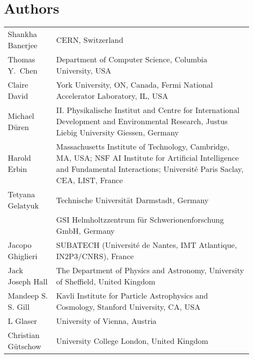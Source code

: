 \documentclass[../SustainableHEP.tex]{subfiles}
\begin{document}
\newpage


\section*{Authors}
{}
\renewcommand{\arraystretch}{1.5}
\noindent\begin{longtable*}{@{}m{0.3\textwidth} p{0.7\textwidth}}
Shankha Banerjee & CERN, Switzerland\\ %

Thomas Y.\ Chen & Department of Computer Science, Columbia University, USA\\

Claire David & York University, ON, Canada, Fermi National Accelerator Laboratory, IL, USA\\

Michael Düren & II. Physikalische Institut and  Centre for International Development and Environmental Research, Justus Liebig University Giessen, Germany\\ %

Harold Erbin & Massachusetts Institute of Technology, Cambridge, MA, USA; NSF AI Institute for Artificial Intelligence and Fundamental Interactions; Université Paris Saclay, CEA, LIST, France\\ %

Tetyana Gelatyuk & Technische Universität Darmstadt,  Germany\\ %
& GSI Helmholtzzentrum für Schwerionenforschung GmbH, Germany\\ %

Jacopo Ghiglieri & SUBATECH (Universit\'e de Nantes, IMT Atlantique, IN2P3/CNRS), France\\ %

Jack Joseph Hall & The Department of Physics and Astronomy, University of Sheffield, United Kingdom\\

Mandeep S. S. Gill & Kavli Institute for Particle Astrophysics and Cosmology, Stanford University, CA, USA \\ %

L Glaser & University of Vienna, Austria \\ %

Christian G\"utschow & University College London, United Kingdom\\


\end{longtable*}
\end{document}
